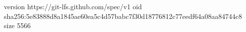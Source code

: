 version https://git-lfs.github.com/spec/v1
oid sha256:5e83888d8a1845ae60ea5c4d57babc7f30d18776812c77eedf64a08aa84744c8
size 5566
